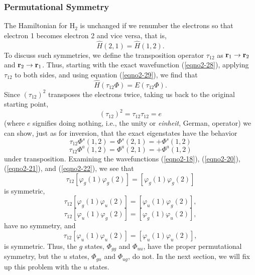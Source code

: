 \subsubsection{Permutational Symmetry}

The Hamiltonian for H$_2$ is unchanged if we renumber the electrons so 
that electron 1 becomes electron 2 and vice versa, that is,
\begin{equation}
{\hat H} ( 2 , 1 ) = {\hat H} ( 1 , 2 ).
\label{eqno2-29}
\end{equation}
To discuss such symmetries, we define the transposition operator
$\tau_{12}$ as ${\bf r}_1 \rightarrow {\bf r}_2$ and ${\bf r}_2
\rightarrow {\bf r}_1$.  Thus, starting with the exact wavefunction
(\ref{eqno2-28}), applying $\tau_{12}$ to both sides, and using
equation (\ref{eqno2-29}), we find that
\begin{equation}
{\hat H} \left( \tau_{12} \Phi \right) = E \left( \tau_{12} \Phi 
\right).
\end{equation}
Since $( \tau_{12})^2$ transposes the electrons twice, taking us back 
to the original starting point,
\begin{equation}
 (\tau_{12})^2 = \tau_{12} \tau_{12} = e
\end{equation}
(where $e$ signifies doing nothing, i.e., the unity or \emph{einheit},
German, operator) we can show, just as for inversion, that the exact
eigenstates have the behavior
\begin{equation}
\tau_{12} \Phi^s ( 1 , 2 ) = \Phi^s ( 2 , 1 ) = + \Phi^s ( 1 , 2 )
\end{equation}
\begin{equation}
\tau_{12} \Phi^a ( 1 , 2 ) = \Phi^a ( 2 , 1 ) = + \Phi^a ( 1 , 2 )
\end{equation}
under transposition. Examining the wavefunctions (\ref{eqno2-18}),
(\ref{eqno2-20}), (\ref{eqno2-21}), and (\ref{eqno2-22}), we see that
\begin{equation}
\tau_{12} \left[ \varphi_g ( 1 ) \varphi_g ( 2 ) \right] = \left[ 
\varphi_g ( 1 ) \varphi_g ( 2 ) \right]
\end{equation}    
is symmetric,
\begin{equation}
\tau_{12}  \left[ \varphi_g ( 1 ) \varphi_u ( 2 ) \right] = \left[ 
\varphi_u ( 1 ) \varphi_g ( 2 ) \right],
\end{equation}    
\begin{equation}
\tau_{12} \left[ \varphi_u ( 1 ) \varphi_g ( 2 ) \right] = \left[ 
\varphi_g ( 1 ) \varphi_u ( 2 ) \right],
\end{equation}       
have no symmetry, and
\begin{equation}
\tau_{12} \left[ \varphi_u ( 1 ) \varphi_u ( 2 ) \right] = \left[ 
\varphi_u ( 1 ) \varphi_u ( 2 ) \right],
\end{equation}
is symmetric. Thus, the $g$ states, $\Phi_{gg}$ and $\Phi_{uu}$,
have the proper permutational symmetry,
but the $u$ states, $\Phi_{gu}$ and $\Phi_{ug}$, do not. In the next 
section, we will fix up this problem with the $u$ states.

